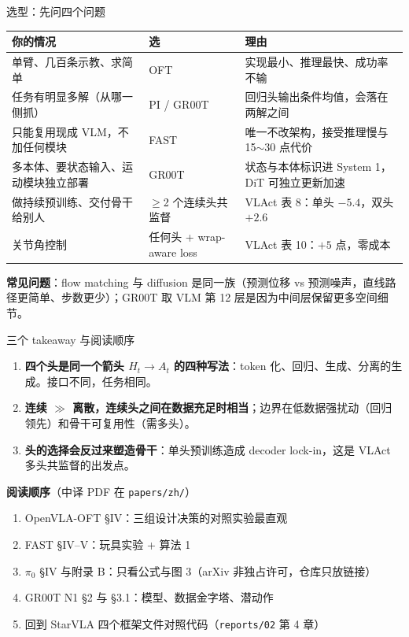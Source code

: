 \documentclass[aspectratio=169,10pt]{beamer}
\begin{document}
\begin{frame}{选型：先问四个问题}
  \begin{center}\small
  \begin{tabular}{p{5.6cm}p{2.2cm}p{5.2cm}}
    \toprule
    你的情况 & 选 & 理由 \\
    \midrule
    单臂、几百条示教、求简单 & OFT & 实现最小、推理最快、成功率不输 \\
    任务有明显多解（从哪一侧抓） & PI / GR00T & 回归头输出条件均值，会落在两解之间 \\
    只能复用现成 VLM，不加任何模块 & FAST & 唯一不改架构，接受推理慢与 15$\sim$30 点代价 \\
    多本体、要状态输入、运动模块独立部署 & GR00T & 状态与本体标识进 System 1，DiT 可独立更新加速 \\
    做持续预训练、交付骨干给别人 & $\ge$2 个连续头共监督 & VLAct 表 8：单头 $-5.4$，双头 $+2.6$ \\
    关节角控制 & 任何头 + wrap-aware loss & VLAct 表 10：$+5$ 点，零成本 \\
    \bottomrule
  \end{tabular}
  \end{center}
  \vspace{6pt}
  \textbf{常见问题}：flow matching 与 diffusion 是同一族（预测位移 vs 预测噪声，直线路径更简单、步数更少）；GR00T 取 VLM 第 12 层是因为中间层保留更多空间细节。
\end{frame}

\begin{frame}{三个 takeaway 与阅读顺序}
  \begin{enumerate}
    \item \textbf{四个头是同一个箭头 $H_t \to A_t$ 的四种写法}：token 化、回归、生成、分离的生成。接口不同，任务相同。
    \item \textbf{连续 $\gg$ 离散，连续头之间在数据充足时相当}；边界在低数据强扰动（回归领先）和骨干可复用性（需多头）。
    \item \textbf{头的选择会反过来塑造骨干}：单头预训练造成 decoder lock-in，这是 VLAct 多头共监督的出发点。
  \end{enumerate}
  \vspace{6pt}
  \textbf{阅读顺序}（中译 PDF 在 \texttt{papers/zh/}）
  \begin{enumerate}
    \item OpenVLA-OFT §IV：三组设计决策的对照实验最直观
    \item FAST §IV–V：玩具实验 + 算法 1
    \item $\pi_0$ §IV 与附录 B：只看公式与图 3（arXiv 非独占许可，仓库只放链接）
    \item GR00T N1 §2 与 §3.1：模型、数据金字塔、潜动作
    \item 回到 StarVLA 四个框架文件对照代码（\texttt{reports/02} 第 4 章）
  \end{enumerate}
\end{frame}
\end{document}
